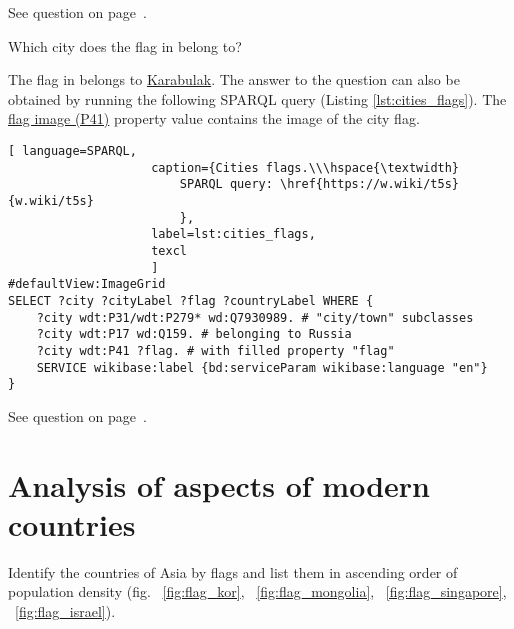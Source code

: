 
See question on page~\pageref{question:cities_over_400_age}.

\begin{exercise}%
    \label{answer:cities_flags}
Which city does the flag in  belong to?
\end{exercise}

The flag in  belongs to \href{https://w.wiki/qqN}{Karabulak}. The answer to the question can also be obtained by running the following SPARQL query (Listing \ref{lst:cities_flags}). The \href{https://www.wikidata.org/wiki/Property:P41}{flag image (P41)} property value contains the image of the city flag.

\begin{lstlisting}[ language=SPARQL, 
                    caption={Cities flags.\\\hspace{\textwidth}
                        SPARQL query: \href{https://w.wiki/t5s}{w.wiki/t5s}
                        },
                    label=lst:cities_flags,
                    texcl 
                    ]
#defaultView:ImageGrid
SELECT ?city ?cityLabel ?flag ?countryLabel WHERE {
	?city wdt:P31/wdt:P279* wd:Q7930989. # "city/town" subclasses
	?city wdt:P17 wd:Q159. # belonging to Russia
	?city wdt:P41 ?flag. # with filled property "flag"
	SERVICE wikibase:label {bd:serviceParam wikibase:language "en"}
}
\end{lstlisting}%

See question on page~\pageref{question:cities_flags}.

\section{Analysis of aspects of modern countries}
\begin{exercise}
\label{answer:population_density}
Identify the countries of Asia by flags and list them in ascending order of population density (fig. ~\ref{fig:flag_kor}, ~\ref{fig:flag_mongolia}, ~\ref{fig:flag_singapore}, ~\ref{fig:flag_israel}).
\end{exercise}


